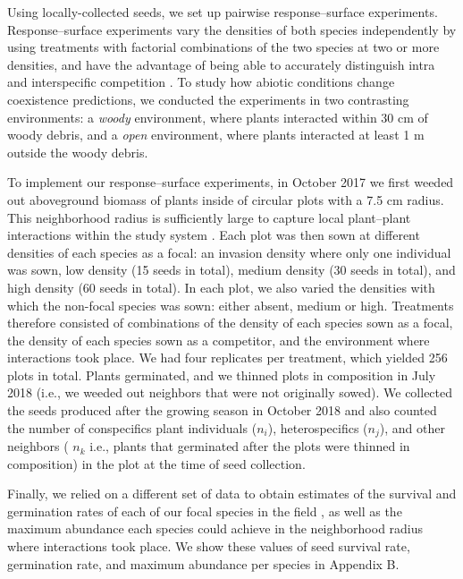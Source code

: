 Using locally-collected seeds, we set up pairwise response--surface experiments. Response--surface experiments vary the densities of both species independently by using treatments with factorial combinations of the two species at two or more densities, and have the advantage of being able to accurately distinguish intra and interspecific competition \citep{inouye_response_2001, hart2018quantify}. To study how abiotic conditions change coexistence predictions, we conducted the experiments in two contrasting environments: a \textit{woody} environment, where plants interacted within 30 cm of woody debris, and a \textit{open} environment, where plants interacted at least 1 m outside the woody debris.

To implement our response--surface experiments, in October 2017 we first weeded out aboveground biomass of plants inside of circular plots with a 7.5 cm radius. This neighborhood radius is sufficiently large to capture local plant--plant interactions within the study system \citep{martyn2021identifying}. Each plot was then sown at different densities of each species as a focal: an invasion density where only one individual was sown, low density (15 seeds in total), medium density (30 seeds in total), and high density (60 seeds in total). In each plot, we also varied the densities with which the non-focal species was sown: either absent, medium or high. Treatments therefore consisted of combinations of the density of each species sown as a focal, the density of each species sown as a competitor, and the environment where interactions took place. We had four replicates per treatment, which yielded 256 plots in total. Plants germinated, and we thinned plots in composition in July 2018 (i.e., we weeded out neighbors that were not originally sowed). We collected the seeds produced after the growing season in October 2018 and also counted the number of conspecifics plant individuals ($n_{i}$), heterospecifics ($n_{j}$), and other neighbors ( $n_{k}$ i.e., plants that germinated after the plots were thinned in composition) in the plot at the time of seed collection.

Finally, we relied on a different set of data to obtain estimates of the survival and germination rates of each of our focal species in the field \citep{towers2021variable}, as well as the maximum abundance each species could achieve in the neighborhood radius where interactions took place. We show these values of seed survival rate, germination rate, and maximum abundance per species in Appendix B.

